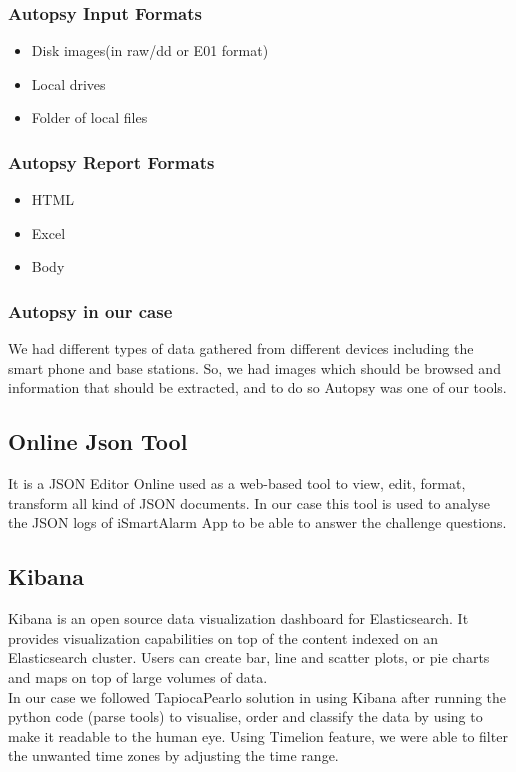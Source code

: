 \documentclass{easychair}
\begin{document}
\subsubsection{Autopsy Input Formats}
\begin{itemize}

\item Disk images(in raw/dd or E01 format)
\item Local drives
\item Folder of local files
\end{itemize}

\subsubsection{Autopsy Report Formats}

\begin{itemize}
\item HTML
\item Excel
\item Body
\end{itemize}

\subsubsection{Autopsy in our case}
We had different types of data gathered from different devices including the smart phone and base stations. So, we had images which should be browsed and information that should be extracted, and to do so Autopsy was one of our tools.

\subsection{Online Json Tool}
It is a JSON Editor Online used as a web-based tool to view, edit, format, transform all kind of JSON documents.
In our case this tool is used to analyse the JSON logs of iSmartAlarm App to be able to answer the challenge questions.
\subsection{Kibana}
Kibana is an open source data visualization dashboard for Elasticsearch. It provides visualization capabilities on top of the content indexed on an Elasticsearch cluster. Users can create bar, line and scatter plots, or pie charts and maps on top of large volumes of data. \cite{Ali_4} \cite{Ali_5} \\ In our case we followed TapiocaPearlo solution in using Kibana after running the python code (parse tools) to visualise, order and classify the data by using to make it readable to the human eye. Using Timelion feature, we were able to filter the unwanted time zones by adjusting the time range.
\end{document}

